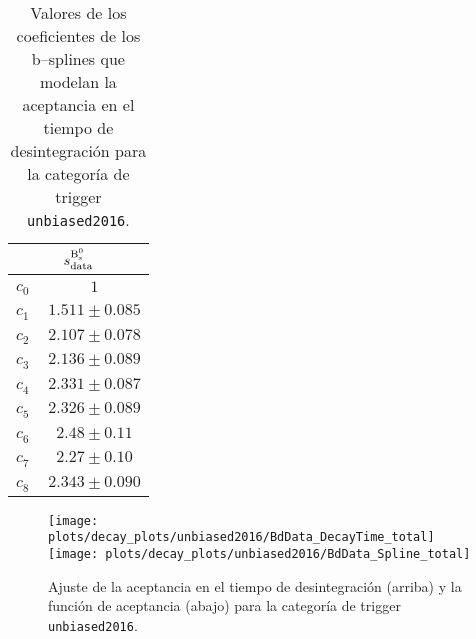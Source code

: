\begin{table}[H]
\begin{multicols}{3}
\begin{tabular}{cc}
\toprule 
\multicolumn{2}{c}{$s_{\text{data}}^{\mathrm{B}{}_{\mathrm{s}}^{0}}$} \\ \midrule
$ c_0^{\phantom{B}} $&$   1                  $\\
$ c_1^{\phantom{B}} $&$   1.511 \pm 0.085    $\\
$ c_2^{\phantom{B}} $&$   2.107 \pm 0.078    $\\
$ c_3^{\phantom{B}} $&$   2.136 \pm 0.089    $\\
$ c_4^{\phantom{B}} $&$   2.331 \pm 0.087    $\\
$ c_5^{\phantom{B}} $&$   2.326 \pm 0.089    $\\
$ c_6^{\phantom{B}} $&$   2.48  \pm 0.11     $\\
$ c_7^{\phantom{B}} $&$   2.27  \pm 0.10     $\\
$ c_8^{\phantom{B}} $&$   2.343 \pm 0.090    $\\
\bottomrule
\end{tabular}

\end{multicols}
\caption{Valores de los coeficientes de los b--splines que modelan la aceptancia en el tiempo de desintegración para la categoría de trigger \texttt{unbiased2016}.} \label{tab:acctimebsdata}
\end{table}


\newpage
\vspace*{\fill}
\begin{figure}[H]
\centering
\texttt{[image: plots/decay\_plots/unbiased2016/BdData\_DecayTime\_total]}
\texttt{[image: plots/decay\_plots/unbiased2016/BdData\_Spline\_total]}
\caption{Ajuste de la aceptancia en el tiempo de desintegración (arriba) y la función de aceptancia (abajo) para la categoría de trigger \texttt{unbiased2016}.}  \label{fig:acctimebsdata}
\end{figure}
\vspace*{\fill}
\newpage

